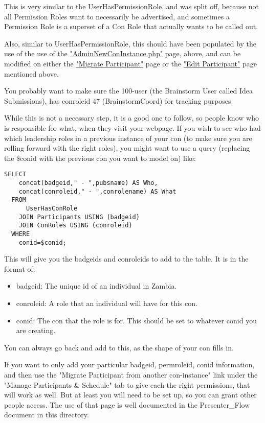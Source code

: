 \documentclass[captions=tablesignature]{scrartcl}
\begin{document}
This is very similar to the UserHasPermissionRole, and was split
off, because not all Permission Roles want to necessarily be
advertised, and sometimes a Permission Role is a superset of a Con
Role that actually wants to be called out.

Also, similar to UserHasPermissionRole, this should have been
populated by the use of the use of the \href{../webpages/AdminNewConInstance.php}{"AdminNewConInstance.php"}
page, above, and can be modified on either the \href{../webpages/StaffEditCreateParticipant.php?action=migrate}{"Migrate Participant"}
page or the \href{../webpages/StaffEditCreateParticipant.php?action=edit}{"Edit Participant"} page mentioned above.

You probably want to make sure the 100-user (the Brainstorm User
called Idea Submissions), has conroleid 47 (BrainstormCoord) for
tracking purposes.

While this is not a necessary step, it is a good one to follow, so
people know who is responsible for what, when they visit your
webpage. If you wish to see who had which leadership roles in a
previous instance of your con (to make sure you are rolling forward
with the right roles), you might want to use a query (replacing the
\$conid with the previous con you want to model on) like:
\begin{verbatim}
SELECT
    concat(badgeid," - ",pubsname) AS Who,
    concat(conroleid," - ",conrolename) AS What
  FROM
      UserHasConRole
    JOIN Participants USING (badgeid)
    JOIN ConRoles USING (conroleid)
  WHERE
    conid=$conid;
\end{verbatim}
This will give you the badgeids and conroleids to add to the
table.  It is in the format of:
\begin{itemize}
\item badgeid: The unique id of an individual in Zambia.
\item conroleid: A role that an individual will have for this con.
\item conid: The con that the role is for.  This should be set to
whatever conid you are creating.
\end{itemize}

You can always go back and add to this, as the shape of your con
fills in.

If you want to only add your particular badgeid, permroleid, conid
information, and then use the "Migrate Participant from another
con-instance" link under the "Manage Participants \& Schedule" tab 
to give each the right permissions, that will work as well.  But at
least you will need to be set up, so you can grant other people
access.  The use of that page is well documented in the
Presenter\_Flow document in this directory.
\end{document}
